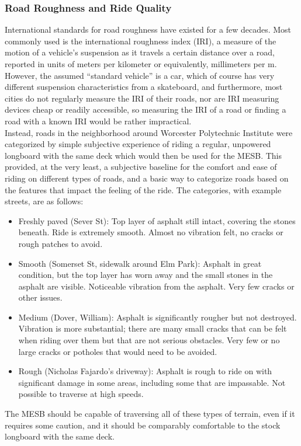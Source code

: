 \documentclass[letterpaper,12pt]{article}
\begin{document}
\subsubsection{Road Roughness and Ride Quality}
International standards for road roughness have existed for a few decades. Most commonly used is the international roughness index (IRI), a measure of the motion of a vehicle's suspension as it travels a certain distance over a road, reported in units of meters per kilometer or equivalently, millimeters per m. However, the assumed ``standard vehicle'' is a car, which of course has very different suspension characteristics from a skateboard, and furthermore, most cities do not regularly measure the IRI of their roads, nor are IRI measuring devices cheap or readily accessible, so measuring the IRI of a road or finding a road with a known IRI would be rather impractical. \\
Instead, roads in the neighborhood around Worcester Polytechnic Institute were categorized by simple subjective experience of riding a regular, unpowered longboard with the same deck which would then be used for the MESB. This provided, at the very least, a subjective baseline for the comfort and ease of riding on different types of roads, and a basic way to categorize roads based on the features that impact the feeling of the ride. The categories, with example streets, are as follows:
\begin{itemize}
 \item Freshly paved (Sever St): Top layer of asphalt still intact, covering the stones beneath. Ride is extremely smooth. Almost no vibration felt, no cracks or rough patches to avoid.
 \item Smooth (Somerset St, sidewalk around Elm Park): Asphalt in great condition, but the top layer has worn away and the small stones in the asphalt are visible. Noticeable vibration from the asphalt. Very few cracks or other issues.
 \item Medium (Dover, William): Asphalt is significantly rougher but not destroyed. Vibration is more substantial; there are many small cracks that can be felt when riding over them but that are not serious obstacles. Very few or no large cracks or potholes that would need to be avoided.
 \item Rough (Nicholas Fajardo’s driveway): Asphalt is rough to ride on with significant damage in some areas, including some that are impassable. Not possible to traverse at high speeds.
\end{itemize}
The MESB should be capable of traversing all of these types of terrain, even if it requires some caution, and it should be comparably comfortable to the stock longboard with the same deck.
\end{document}
